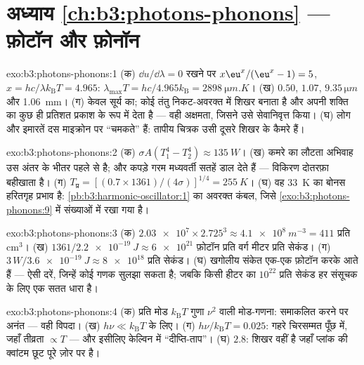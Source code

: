\section*{अध्याय \ref{ch:b3:photons-phonons} --- फ़ोटॉन और फ़ोनॉन}

\begin{solution}{exo:b3:photons-phonons:1}
(क) $\dd u/\dd\lambda = 0$ रखने पर $x\eu^x/(\eu^x - 1) = 5$,
$x = hc/\lambda k_{\text{B}}T = 4.965$: $\lambda_{\max}T =
hc/4.965k_{\text{B}} = \qty{2898}{\micro m.K}$। (ख) $0.50$,
$1.07$, $9.35\,\unit{\micro m}$ और \qty{1.06}{mm}। (ग) केवल
सूर्य का; कोई तंतु निकट-अवरक्त में शिखर बनाता है और अपनी शक्ति का
कुछ ही प्रतिशत प्रकाश के रूप में देता है --- वही अक्षमता, जिसने
उसे सेवानिवृत्त किया। (घ) लोग और इमारतें दस माइक्रोन पर ``चमकते''
हैं: तापीय चित्रक उसी दूसरे शिखर के कैमरे हैं।
\end{solution}

\begin{solution}{exo:b3:photons-phonons:2}
(क) $\sigma A(T_1^4 - T_2^4) \approx \qty{135}{W}$। (ख) कमरे का
लौटता अभिवाह उस अंतर के भीतर पहले से है; और कपड़े गरम मध्यवर्ती
सतहें डाल देते हैं --- विकिरण दोतरफ़ा बहीखाता है। (ग)
$T_{\text{प्र}} = [(0.7 \times 1361)/(4\sigma)]^{1/4} =
\qty{255}{K}$। (घ) वह \qty{33}{K} का बोनस हरितगृह प्रभाव है:
\cref{pb:b3:harmonic-oscillator:1} का अवरक्त कंबल, जिसे
\cref{exo:b3:photons-phonons:9} में संख्याओं में रखा गया है।
\end{solution}

\begin{solution}{exo:b3:photons-phonons:3}
(क) $\num{2.03e7} \times 2.725^3 \approx \qty{4.1e8}{m^{-3}} =
411$ प्रति cm$^3$। (ख) $1361/\qty{2.2e-19}{J} \approx
\num{6e21}$ फ़ोटॉन प्रति वर्ग मीटर प्रति सेकंड। (ग) $3\,\unit{W}/
\qty{3.6e-19}{J} \approx \num{8e18}$ प्रति सेकंड। (घ) खगोलीय
संकेत एक-एक फ़ोटॉन करके आते हैं --- ऐसी दरें, जिन्हें कोई गणक
सुलझा सकता है; जबकि किसी हीटर का $10^{22}$ प्रति सेकंड हर संसूचक
के लिए एक सतत धारा है।
\end{solution}

\begin{solution}{exo:b3:photons-phonons:4}
(क) प्रति मोड $k_{\text{B}}T$ गुणा $\nu^2$ वाली मोड-गणना:
समाकलित करने पर अनंत --- वही विपदा। (ख) $h\nu \ll
k_{\text{B}}T$ के लिए। (ग) $h\nu/k_{\text{B}}T = 0.025$: गहरे
चिरसम्मत पूँछ में, जहाँ तीव्रता $\propto T$ --- और इसीलिए केल्विन
में ``दीप्ति-ताप''। (घ) $2.8$: शिखर वहीं है
जहाँ प्लांक की क्वांटम छूट पूरे ज़ोर पर है।
\end{solution}

